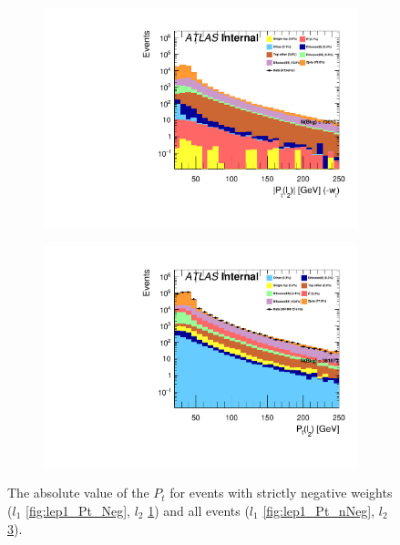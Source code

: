 \begin{figure}
{\begin{subfigure}{.425\textwidth}
        \includegraphics[width=\textwidth]{Figures/FeaturesHistograms/lep2_Pt_Neg.pdf}
        \caption{}
        \label{fig:lep2_Pt_Neg}
    \end{subfigure}
    \hfill
    \begin{subfigure}{.425\textwidth}
        \includegraphics[width=\textwidth]{Figures/FeaturesHistograms/lep2_Pt_nNeg.pdf}
        \caption{ }
        \label{fig:lep2_Pt_nNeg}
    \end{subfigure}
    }
    \caption{The absolute value of the $P_t$ for events with strictly negative weights 
    ($l_1$ \ref{fig:lep1_Pt_Neg}, $l_2$ \ref{fig:lep2_Pt_Neg}) and all events
    ($l_1$ \ref{fig:lep1_Pt_nNeg}, $l_2$ \ref{fig:lep2_Pt_nNeg}). }
\end{figure}

